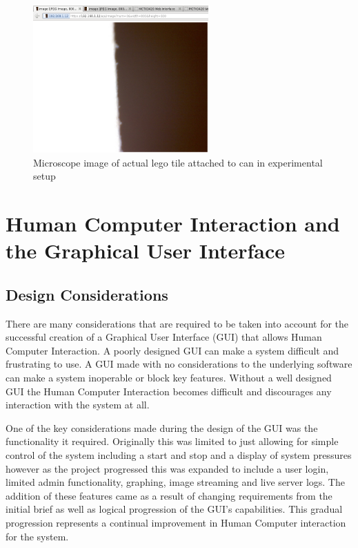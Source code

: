 \begin{figure}[H]
	\centering
	\includegraphics[width=0.6\textwidth]{figures/image_in_api.png}
	\caption{Microscope image of actual lego tile attached to can in experimental setup} 
	\label{image_in_api.png}
\end{figure}


\section{Human Computer Interaction and the Graphical User Interface}

\subsection{Design Considerations}

There are many considerations that are required to be taken into account for the successful creation of a Graphical User Interface (GUI) that allows Human Computer Interaction.  A poorly designed GUI can make a system difficult and frustrating to use. A GUI made with no considerations to the underlying software can make a system inoperable or block key features.  Without a well designed GUI the Human Computer Interaction becomes difficult and discourages any interaction with the system at all.

	One of the key considerations made during the design of the GUI was the functionality it required.  Originally this was limited to just allowing for simple control of the system including a start and stop and a display of system pressures however as the project progressed this was expanded to include a user login, limited admin functionality, graphing, image streaming and live server logs.  The addition of these features came as a result of changing requirements from the initial brief as well as logical progression of the GUI's capabilities.  This gradual progression represents a continual improvement in Human Computer interaction for the system.  

